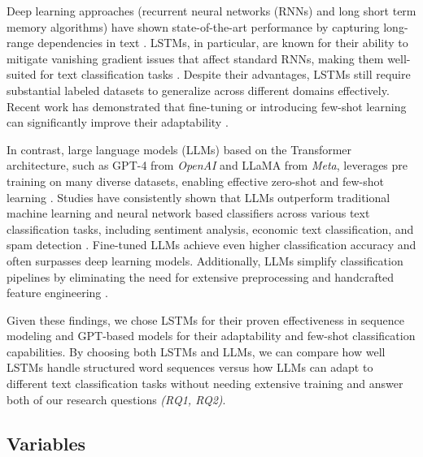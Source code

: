 Deep learning approaches (recurrent neural networks (RNNs) and long short term memory algorithms) have shown state-of-the-art performance by capturing long-range dependencies in text \cite{sutskever2014sequence}. LSTMs, in particular, are known for their ability to mitigate vanishing gradient issues that affect standard RNNs, making them well-suited for text classification tasks \cite{hochreiter1997long}. Despite their advantages, LSTMs still require substantial labeled datasets to generalize across different domains effectively. Recent work has demonstrated that fine-tuning or introducing few-shot learning can significantly improve their adaptability \cite{jamshidi2024effective}.

In contrast, large language models (LLMs) based on the Transformer architecture, such as GPT-4 from \textit{OpenAI} and LLaMA from \textit{Meta}, leverages pre training on many diverse datasets, enabling effective zero-shot and few-shot learning \cite{brown2020language} \cite{touvron2023llama}. Studies have consistently shown that LLMs outperform traditional machine learning and neural network based classifiers across various text classification tasks, including sentiment analysis, economic text classification, and spam detection \cite{moller2024parrot,betianu2024dallmi}. Fine-tuned LLMs achieve even higher classification accuracy and often surpasses deep learning models. Additionally, LLMs simplify classification pipelines by eliminating the need for extensive preprocessing and handcrafted feature engineering \cite{oh2024language}.

Given these findings, we chose LSTMs for their proven effectiveness in sequence modeling and GPT-based models for their adaptability and few-shot classification capabilities. By choosing both LSTMs and LLMs, we can compare how well LSTMs handle structured word sequences versus how LLMs can adapt to different text classification tasks without needing extensive training and answer both of our research questions \textit{(RQ1, RQ2)}.

\subsection{Variables}

%
